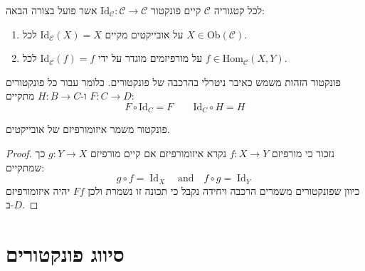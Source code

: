 \documentclass{tstextbook}
\begin{document}
\begin{proposition}
לכל קטגוריה \(\mathcal{C}\) קיים פונקטור \(\mathrm{Id}_{\mathcal{C}}:\mathcal{C}\to \mathcal{C}\) אשר פועל בצורה הבאה:

  \begin{enumerate}
    \item על אובייקטים מקיים \(\mathrm{Id}_{\mathcal{C}}(X)=X\) לכל \(X \in \mathrm{Ob}(\mathcal{C})\). 


    \item על מורפיזמים מוגדר על ידי \(\mathrm{Id}_{\mathcal{C}}(f)=f\) לכל \(f \in \mathrm{Hom}_{\mathcal{C}}(X,Y)\). 


  \end{enumerate}
\end{proposition}
\begin{remark}
פונקטור הזהות משמש כאיבר ניטרלי בהרכבה של פונקטורים. כלומר עבור כל פונקטורים \(F:C\to D\) ו-\(H:B\to C\) מתקיים:
$$F\circ{\mathrm{Id}}_{C}=F\qquad{\mathrm{Id}}_{C}\circ H=H$$

\end{remark}
\begin{proposition}
פונקטור משמר איזומורפיזם של אובייקטים.

\end{proposition}
\begin{proof}
נזכור כי מורפיזם \(f:X\to Y\) נקרא איזומורפיזם אם קיים מורפיזם \(g:Y\to X\) כך שמתקיים:
$$g\circ f=\operatorname{Id}_{X}\quad{\mathrm{and}}\quad f\circ g=\operatorname{Id}_{Y}$$
כיוון שפונקטורים משמרים הרכבה ויחידה נקבל כי תכונה זו נשמרת ולכן \(Ff\) יהיה איזומורפיזם ב-\(D\).

\end{proof}
\section{סיווג פונקטורים}
\end{document}
